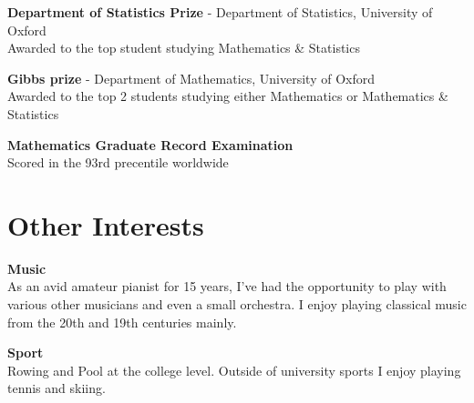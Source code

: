 \documentclass[12pt,a4paper,sans]{moderncv}
\begin{document}
\textbf{Department of Statistics Prize } - Department of Statistics, University of Oxford \\
{Awarded to the top student studying Mathematics \& Statistics}

\vspace{3mm}

\textbf{Gibbs prize} - Department of Mathematics, University of Oxford \\
{Awarded to the top 2 students studying either Mathematics or Mathematics \& Statistics}

\vspace{3mm}

\textbf{Mathematics Graduate Record Examination} \\ 
{Scored in the 93rd precentile worldwide}

\vspace{-3mm}

\section{Other Interests}

\textbf{Music} \\
{As an avid amateur pianist for 15 years, I've had the opportunity to play with various other musicians and even a small orchestra. I enjoy playing classical music from the 20th and 19th centuries mainly. }

\vspace{3mm}

\textbf{Sport} \\
{Rowing and Pool at the college level. Outside of university sports I enjoy playing tennis and skiing.}
\end{document}
